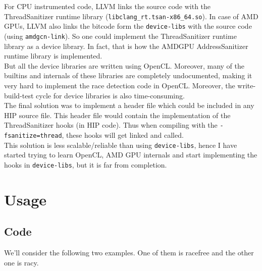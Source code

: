 \documentclass{btp}
\begin{document}
For CPU instrumented code, LLVM links the source code with the ThreadSanitizer runtime library (\texttt{libclang\_rt.tsan-x86\_64.so}). In case of AMD GPUs, LLVM also links the bitcode form the \texttt{device-libs} with the source code (using \texttt{amdgcn-link}). So one could implement the ThreadSanitizer runtime library as a device library. In fact, that is how the AMDGPU AddressSanitizer runtime library is implemented.
\\
\newline
But all the device libraries are written using OpenCL. Moreover, many of the builtins and internals of these libraries are completely undocumented, making it very hard to implement the race detection code in OpenCL. Moreover, the write-build-test cycle for device libraries is also time-consuming.
\\
\newline
The final solution was to implement a header file which could be included in any HIP source file. This header file would contain the implementation of the ThreadSanitizer hooks (in HIP code). Thus when compiling with the \texttt{-fsanitize=thread}, these hooks will get linked and called.
\\
\newline
This solution is less scalable/reliable than using \texttt{device-libs}, hence I have started trying to learn OpenCL, AMD GPU internals and start implementing the hooks in \texttt{device-libs}, but it is far from completion.

\section{Usage}

\subsection{Code}

We'll consider the following two examples. One of them is racefree and the other one is racy.
\end{document}
